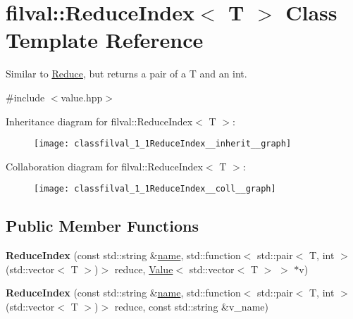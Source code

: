 \hypertarget{classfilval_1_1ReduceIndex}{}\section{filval\+:\+:Reduce\+Index$<$ T $>$ Class Template Reference}
\label{classfilval_1_1ReduceIndex}


Similar to \hyperlink{classfilval_1_1Reduce}{Reduce}, but returns a pair of a T and an int.  




{\ttfamily \#include $<$value.\+hpp$>$}



Inheritance diagram for filval\+:\+:Reduce\+Index$<$ T $>$\+:
\nopagebreak
\begin{figure}[H]
\begin{center}
\leavevmode
\texttt{[image: classfilval\_1\_1ReduceIndex\_\_inherit\_\_graph]}
\end{center}
\end{figure}


Collaboration diagram for filval\+:\+:Reduce\+Index$<$ T $>$\+:
\nopagebreak
\begin{figure}[H]
\begin{center}
\leavevmode
\texttt{[image: classfilval\_1\_1ReduceIndex\_\_coll\_\_graph]}
\end{center}
\end{figure}
\subsection*{Public Member Functions}
\begin{DoxyCompactItemize}
\item 
\hypertarget{classfilval_1_1ReduceIndex_abb394f01acdcb0bd77abfb05782baf0b}{}\label{classfilval_1_1ReduceIndex_abb394f01acdcb0bd77abfb05782baf0b} 
{\bfseries Reduce\+Index} (const std\+::string \&\hyperlink{classfilval_1_1GenValue_a007e38c03ee041c2a657afa3d6e91ab1}{name}, std\+::function$<$ std\+::pair$<$ T, int $>$(std\+::vector$<$ T $>$)$>$ reduce, \hyperlink{classfilval_1_1Value}{Value}$<$ std\+::vector$<$ T $>$ $>$ $\ast$v)
\item 
\hypertarget{classfilval_1_1ReduceIndex_a1c0c6eecd71c861d58723d82e95b76ea}{}\label{classfilval_1_1ReduceIndex_a1c0c6eecd71c861d58723d82e95b76ea} 
{\bfseries Reduce\+Index} (const std\+::string \&\hyperlink{classfilval_1_1GenValue_a007e38c03ee041c2a657afa3d6e91ab1}{name}, std\+::function$<$ std\+::pair$<$ T, int $>$(std\+::vector$<$ T $>$)$>$ reduce, const std\+::string \&v\+\_\+name)
\end{DoxyCompactItemize}
